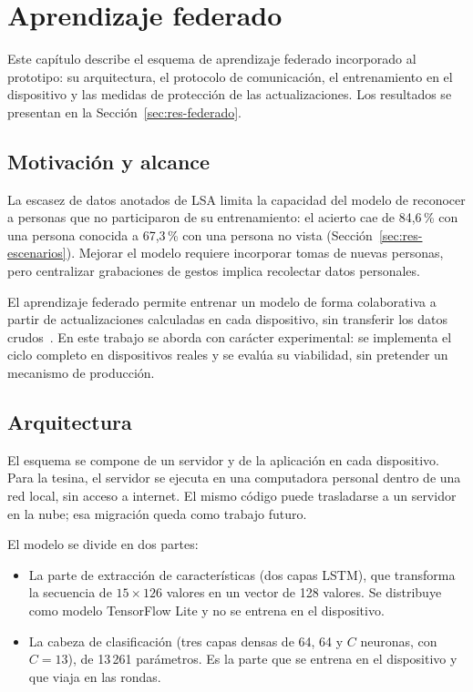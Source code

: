 \chapter{Aprendizaje federado}
\label{cap:federado}

Este capítulo describe el esquema de aprendizaje federado incorporado al prototipo: su arquitectura, el protocolo de comunicación, el entrenamiento en el dispositivo y las medidas de protección de las actualizaciones. Los resultados se presentan en la Sección~\ref{sec:res-federado}.

\section{Motivación y alcance}

La escasez de datos anotados de LSA limita la capacidad del modelo de reconocer a personas que no participaron de su entrenamiento: el acierto cae de 84,6\,\% con una persona conocida a 67,3\,\% con una persona no vista (Sección~\ref{sec:res-escenarios}). Mejorar el modelo requiere incorporar tomas de nuevas personas, pero centralizar grabaciones de gestos implica recolectar datos personales.

El aprendizaje federado permite entrenar un modelo de forma colaborativa a partir de actualizaciones calculadas en cada dispositivo, sin transferir los datos crudos~\cite{mcmahan2017fedavg}. En este trabajo se aborda con carácter experimental: se implementa el ciclo completo en dispositivos reales y se evalúa su viabilidad, sin pretender un mecanismo de producción.

\section{Arquitectura}

El esquema se compone de un servidor y de la aplicación en cada dispositivo. Para la tesina, el servidor se ejecuta en una computadora personal dentro de una red local, sin acceso a internet. El mismo código puede trasladarse a un servidor en la nube; esa migración queda como trabajo futuro.

El modelo se divide en dos partes:

\begin{itemize}
    \item La parte de extracción de características (dos capas LSTM), que transforma la secuencia de $15 \times 126$ valores en un vector de 128 valores. Se distribuye como modelo TensorFlow Lite y no se entrena en el dispositivo.
    \item La cabeza de clasificación (tres capas densas de 64, 64 y $C$ neuronas, con $C = 13$), de 13\,261 parámetros. Es la parte que se entrena en el dispositivo y que viaja en las rondas.
\end{itemize}

